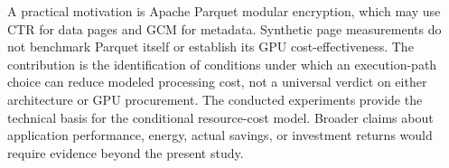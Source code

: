 \documentclass[11pt,b5paper]{article}
\begin{document}
A practical motivation is Apache Parquet modular encryption, which may use CTR for data pages and GCM for metadata. Synthetic page measurements do not benchmark Parquet itself or establish its GPU cost-effectiveness. The contribution is the identification of conditions under which an execution-path choice can reduce modeled processing cost, not a universal verdict on either architecture or GPU procurement. The conducted experiments provide the technical basis for the conditional resource-cost model. Broader claims about application performance, energy, actual savings, or investment returns would require evidence beyond the present study.
\end{document}
